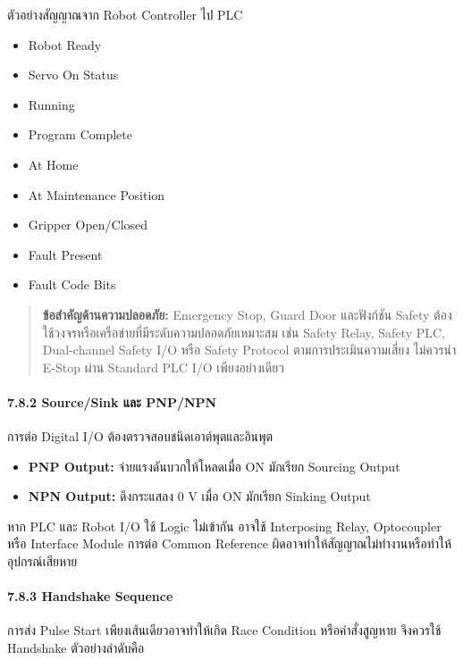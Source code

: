 ตัวอย่างสัญญาณจาก Robot Controller ไป PLC

\begin{itemize}
    \item Robot Ready
    \item Servo On Status
    \item Running
    \item Program Complete
    \item At Home
    \item At Maintenance Position
    \item Gripper Open/Closed
    \item Fault Present
    \item Fault Code Bits
\end{itemize}

\begin{quote}
\textbf{ข้อสำคัญด้านความปลอดภัย:} Emergency Stop, Guard Door และฟังก์ชัน Safety ต้องใช้วงจรหรือเครือข่ายที่มีระดับความปลอดภัยเหมาะสม เช่น Safety Relay, Safety PLC, Dual-channel Safety I/O หรือ Safety Protocol ตามการประเมินความเสี่ยง ไม่ควรนำ E-Stop ผ่าน Standard PLC I/O เพียงอย่างเดียว
\end{quote}

\paragraph{7.8.2 Source/Sink และ PNP/NPN}

การต่อ Digital I/O ต้องตรวจสอบชนิดเอาต์พุตและอินพุต

\begin{itemize}
    \item \textbf{PNP Output:} จ่ายแรงดันบวกให้โหลดเมื่อ ON มักเรียก Sourcing Output
    \item \textbf{NPN Output:} ดึงกระแสลง 0 V เมื่อ ON มักเรียก Sinking Output
\end{itemize}

หาก PLC และ Robot I/O ใช้ Logic ไม่เข้ากัน อาจใช้ Interposing Relay, Optocoupler หรือ Interface Module การต่อ Common Reference ผิดอาจทำให้สัญญาณไม่ทำงานหรือทำให้อุปกรณ์เสียหาย

\paragraph{7.8.3 Handshake Sequence}

การส่ง Pulse Start เพียงเส้นเดียวอาจทำให้เกิด Race Condition หรือคำสั่งสูญหาย จึงควรใช้ Handshake ตัวอย่างลำดับคือ

